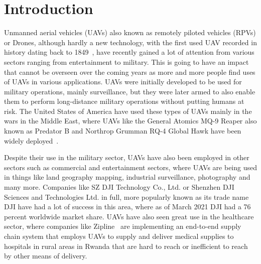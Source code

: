 


\chapter{Introduction}
\label{chap:thesis-introduction}

Unmanned aerial vehicles (UAVs) also known as remotely piloted vehicles (RPVs) or Drones, although hardly a new technology, with the first used UAV recorded in history dating back to 1849~\cite{vasileprisacariujdrm2017}, have recently gained a lot of attention from various sectors ranging from entertainment to military. This is going to have an impact that cannot be overseen over the coming years as more and more people find uses of UAVs in various applications. UAVs were initially developed to be used for military operations, mainly surveillance, but they were later armed to also enable them to perform long-distance military operations without putting humans at risk. The United States of America have used these types of UAVs mainly in the wars in the Middle East, where UAVs like the General Atomics MQ-9 Reaper also known as Predator B and Northrop Grumman RQ-4 Global Hawk have been widely deployed~\cite{samaanorientxxi2022}.

Despite their use in the military sector, UAVs have also been employed in other sectors such as commercial and entertainment sectors, where UAVs are being used in things like land geography mapping, industrial surveillance, photography and many more. Companies like SZ DJI Technology Co., Ltd. or Shenzhen DJI Sciences and Technologies Ltd. in full, more popularly known as its trade name DJI have had a lot of success in this area, where as of March 2021 DJI had a 76 percent worldwide market share\cite{djimarketshare2021}. UAVs have also seen great use in the healthcare sector, where companies like Zipline~\cite{droneslevy2022} are implementing an end-to-end supply chain system that employs UAVs to supply and deliver medical supplies to hospitals in rural areas in Rwanda that are hard to reach or inefficient to reach by other means of delivery.

